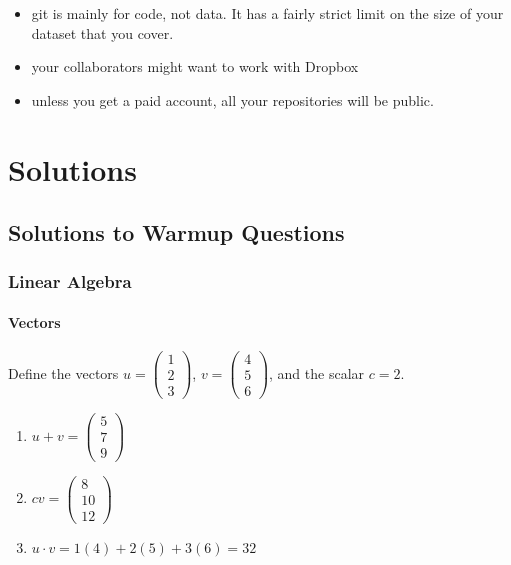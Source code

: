 \documentclass[]{book}
\providecommand{\tightlist}{%
  \setlength{\itemsep}{0pt}\setlength{\parskip}{0pt}}
\theoremstyle{definition}
\theoremstyle{definition}
\theoremstyle{definition}
\theoremstyle{remark}
\begin{document}
\begin{itemize}
\tightlist
\item
  git is mainly for code, not data. It has a fairly strict limit on the
  size of your dataset that you cover.
\item
  your collaborators might want to work with Dropbox
\item
  unless you get a paid account, all your repositories will be public.
\end{itemize}

\part{Solutions}\label{part-solutions}

\chapter*{Solutions to Warmup
Questions}\label{solutions-to-warmup-questions}

\section*{Linear Algebra}\label{linear-algebra-1}

\subsection*{Vectors}\label{vectors-1}

Define the vectors \(u = \begin{pmatrix} 1 \\2 \\3 \end{pmatrix}\),
\(v = \begin{pmatrix} 4\\5\\6 \end{pmatrix}\), and the scalar \(c = 2\).

\begin{enumerate}
\def\labelenumi{\arabic{enumi}.}
\tightlist
\item
  \(u + v = \begin{pmatrix}5\\7\\9\end{pmatrix}\)
\item
  \(cv = \begin{pmatrix}8\\10\\12\end{pmatrix}\)
\item
  \(u \cdot v = 1(4) + 2(5) + 3(6) = 32\)
\end{enumerate}
\end{document}
